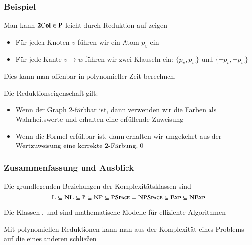 \documentclass[onlymath]{beamer}
\begin{document}
\begin{frame}\frametitle{Beispiel}



Man kann $\textbf{\textcolor{black}{2Col}}\in{\textsc{P}}$ leicht durch Reduktion auf  zeigen:
\begin{itemize}
\item Für jeden Knoten $v$ führen wir ein Atom $p_v$ ein
\item Für jede Kante $v\to w$ führen wir zwei Klauseln ein: $\{p_v,p_w\}$ und $\{\neg p_v,\neg p_w\}$\pause
\end{itemize}
Dies kann man offenbar in polynomieller Zeit berechnen.\bigskip\pause%

Die Reduktionseigenschaft gilt:
\begin{itemize}
\item Wenn der Graph 2-färbbar ist, dann verwenden wir die Farben als Wahrheitswerte und erhalten eine
	erfüllende Zuweisung
\item Wenn die Formel erfüllbar ist, dann erhalten wir umgekehrt aus der Wertzuweisung eine korrekte 2-Färbung.\qed
\end{itemize}

\end{frame}


\begin{frame}\frametitle{Zusammenfassung und Ausblick}

Die grundlegenden Beziehungen der Komplexitätsklassen sind
\[{\textsc{L}}\subseteq{\textsc{NL}}\subseteq {\textsc{P}}\subseteq{\textsc{NP}}\subseteq{\textsc{PSpace}}= {\textsc{NPSpace}}\subseteq {\textsc{Exp}}\subseteq {\textsc{NExp}}\]

Die Klassen ,  und  sind mathematische Modelle für effiziente Algorithmen\bigskip

Mit polynomiellen Reduktionen kann man aus der Komplexität eines Problems auf die eines anderen schließen\bigskip


\end{frame}
\end{document}
